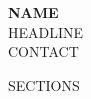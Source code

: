 \documentclass[10pt,{{PAGE_SIZE}}paper]{article}
\begin{document}
{\Huge\bfseries {{NAME}}}\\[1pt]
{\large {{HEADLINE}}}\\[2pt]
{\small {{CONTACT}}}

{{SECTIONS}}
\end{document}
